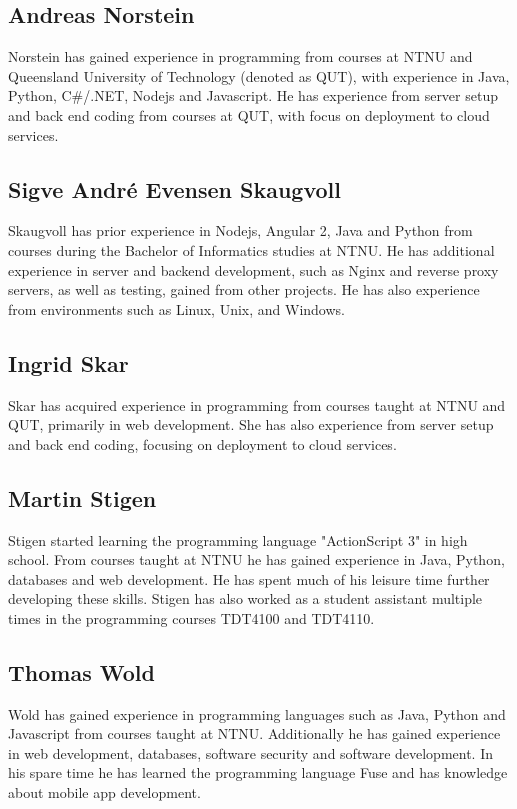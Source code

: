 \subsection{Andreas Norstein}
Norstein has gained experience in programming from courses at NTNU and Queensland University of Technology (denoted as QUT), with experience in Java, Python, C\#/.NET, Nodejs and Javascript. He has experience from server setup and back end coding from courses at QUT, with focus on deployment to cloud services.  

\subsection{Sigve André Evensen Skaugvoll}
Skaugvoll has prior experience in Nodejs, Angular 2, Java and Python from courses during the Bachelor of Informatics studies at NTNU. He has additional experience in server and backend development, such as Nginx and reverse proxy servers, as well as testing, gained from other projects. He has also experience from environments such as Linux, Unix, and Windows.

\subsection{Ingrid Skar}
Skar has acquired experience in programming from courses taught at NTNU and QUT, primarily in web development. She has also experience from server setup and back end coding, focusing on deployment to cloud services.  

\subsection{Martin Stigen}
Stigen started learning the programming language "ActionScript 3" in high school. From courses taught at NTNU he has gained experience in Java, Python, databases and web development. He has spent much of his leisure time further developing these skills. Stigen has also worked as a student assistant multiple times in the programming courses TDT4100 and TDT4110. 

\subsection{Thomas Wold}
Wold has gained experience in programming languages such as Java, Python and Javascript from courses taught at NTNU. Additionally he has gained experience in web development, databases, software security and software development. In his spare time he has learned the programming language Fuse and has knowledge about mobile app development.

\cleardoublepage